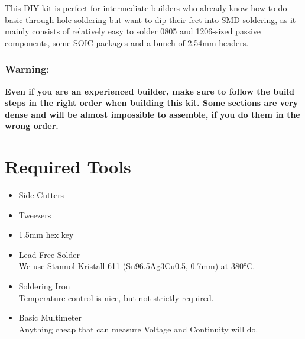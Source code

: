 \documentclass[12pt, a4paper]{article}
\begin{document}
\vspace{3mm}

This DIY kit is perfect for intermediate builders who already know how to do basic through-hole
soldering but want to dip their feet into SMD soldering, as it mainly consists of relatively
easy to solder 0805 and 1206-sized passive components, some SOIC packages and a bunch of 2.54mm
headers.

{
    \color{red}
    \subsubsection*{Warning:}
    \vspace{-3mm}
    \textbf{
        Even if you are an experienced builder, make sure to follow the build steps in the right
        order when building this kit. Some sections are very dense and will be almost impossible
        to assemble, if you do them in the wrong order.
    }
    \vspace{5mm}
}

\pagebreak

\section*{Required Tools}

\begin{itemize}
    \item Side Cutters
    \item Tweezers
    \item 1.5mm hex key
    \item Lead-Free Solder
    \\ {\small We use Stannol Kristall 611 (Sn96.5Ag3Cu0.5, 0.7mm) at 380°C.}
    \item Soldering Iron
    \\ {\small Temperature control is nice, but not strictly required.}
    \item Basic Multimeter
    \\ {\small Anything cheap that can measure Voltage and Continuity will do.}
\end{itemize}
\end{document}
